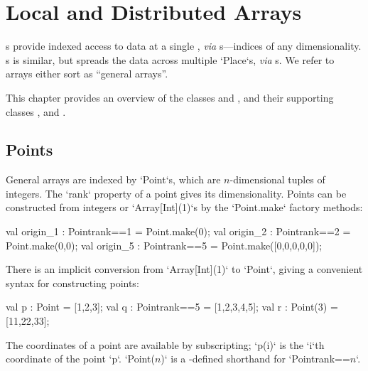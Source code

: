 \chapter{Local and Distributed Arrays}\label{XtenArrays}

s provide indexed access to data at a single , {\em via}
s---indices of any dimensionality. s is similar, but
spreads the data across multiple \xcd`Place`s, {\em via} s.  
We refer to arrays either sort as ``general arrays''.  


This chapter provides an overview of the  classes 
and , and their supporting classes , 
and .  


\section{Points}\label{point-syntax}


General arrays are indexed by \xcd`Point`s, which are $n$-dimensional tuples of
integers.  The \xcd`rank`
property of a point gives its dimensionality.  Points can be constructed from
integers or \xcd`Array[Int](1)`s by
the \xcd`Point.make` factory methods:
\begin{xten}
val origin_1 : Point{rank==1} = Point.make(0);
val origin_2 : Point{rank==2} = Point.make(0,0);
val origin_5 : Point{rank==5} = Point.make([0,0,0,0,0]);
\end{xten}

There is an implicit conversion from \xcd`Array[Int](1)` to 
\xcd`Point`, giving
a convenient syntax for constructing points: 

\begin{xten}
val p : Point = [1,2,3];
val q : Point{rank==5} = [1,2,3,4,5];
val r : Point(3) = [11,22,33];
\end{xten}

The coordinates of a point are available by subscripting; \xcd`p(i)` is the
\xcd`i`th coordinate of the point \xcd`p`. 
\xcdmath`Point($n$)` is a -defined shorthand  for 
\xcdmath`Point{rank==$n$}`.


